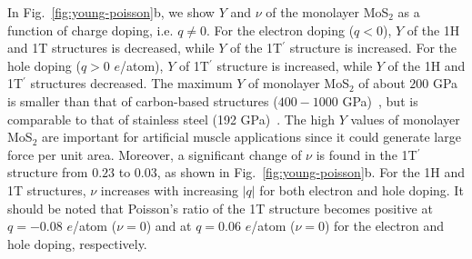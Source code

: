 \documentclass[12pt]{iopart}
\begin{document}



In Fig.~\ref{fig:young-poisson}b, we show $Y$ and $\nu$ of the
monolayer MoS$_2$ as a function of charge doping, i.e. $q\ne 0$.  For
the electron doping ($q<0$), $Y$ of the 1H and 1T structures is
decreased, while $Y$ of the 1T$^\prime$ structure is increased.  For
the hole doping ($q>0$ $e$/atom), $Y$ of 1T$^\prime$ structure is
increased, while $Y$ of the 1H and 1T$^\prime$ structures decreased.
The maximum $Y$ of monolayer MoS$_2$ of about $200$ GPa is smaller
than that of carbon-based structures ($400-1000$
GPa)~\cite{hung2017charge,hung2017three}, but is comparable to that of
stainless steel (192 GPa)~\cite{rho1993young}.  The high $Y$ values of
monolayer MoS$_2$ are important for artificial muscle applications
since it could generate large force per unit area. Moreover, a
significant change of $\nu$ is found in the 1T$^\prime$ structure from
$0.23$ to $0.03$, as shown in Fig.~\ref{fig:young-poisson}b.  For the
1H and 1T structures, $\nu$ increases with increasing $|q|$ for both
electron and hole doping.  It should be noted that Poisson's ratio of
the 1T structure becomes positive at $q=-0.08$ $e$/atom ($\nu=0$) and
at $q=0.06$ $e$/atom ($\nu=0$) for the electron and hole doping,
respectively.
\end{document}
